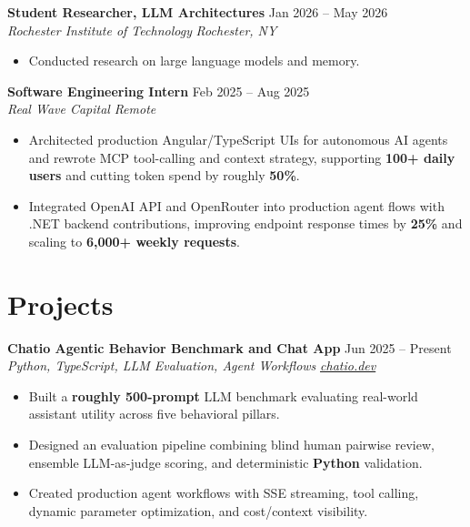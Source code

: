 \documentclass[10pt,letterpaper]{article}
\newif\ifresumeFirstRole
\newcommand{\resumeRole}[4]{%
  \ifresumeFirstRole
    \global\resumeFirstRolefalse
  \else
    \vspace{0pt plus 1fill}%
  \fi
  \textbf{#1} \hfill #2\\
  \textit{#3} \hfill \textit{#4}
}
\begin{document}
\resumeRole{Student Researcher, LLM Architectures}{Jan 2026 -- May 2026}{Rochester Institute of Technology}{Rochester, NY}
\begin{itemize}
  \item Conducted research on large language models and memory.
\end{itemize}

\resumeRole{Software Engineering Intern}{Feb 2025 -- Aug 2025}{Real Wave Capital}{Remote}
\begin{itemize}
  \item Architected production Angular/TypeScript UIs for autonomous AI agents and rewrote MCP tool-calling and context strategy, supporting \textbf{100+ daily users} and cutting token spend by roughly \textbf{50\%}.
  \item Integrated OpenAI API and OpenRouter into production agent flows with .NET backend contributions, improving endpoint response times by \textbf{25\%} and scaling to \textbf{6,000+ weekly requests}.
\end{itemize}

\section*{Projects}
\resumeRole{Chatio Agentic Behavior Benchmark and Chat App}{Jun 2025 -- Present}{Python, TypeScript, LLM Evaluation, Agent Workflows}{\href{https://chatio.dev}{chatio.dev}}
\begin{itemize}
  \item Built a \textbf{roughly 500-prompt} LLM benchmark evaluating real-world assistant utility across five behavioral pillars.
  \item Designed an evaluation pipeline combining blind human pairwise review, ensemble LLM-as-judge scoring, and deterministic \textbf{Python} validation.
  \item Created production agent workflows with SSE streaming, tool calling, dynamic parameter optimization, and cost/context visibility.
\end{itemize}
\end{document}
